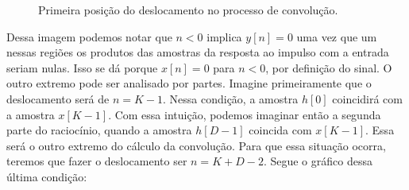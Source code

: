 \documentclass[a4paper,12pt]{article}
\begin{document}
\begin{figure}[H]
  \centering
  \caption{Primeira posição do deslocamento no processo de convolução.}
  \label{fig:begin_convolution}
\end{figure}

Dessa imagem podemos notar que $n<0$ implica $y[n]=0$ uma vez que um nessas regiões os produtos das amostras da resposta ao impulso com a entrada seriam nulas. Isso se dá porque $x[n]=0$ para $n<0$, por definição do sinal.
O outro extremo pode ser analisado por partes. Imagine primeiramente que o deslocamento será de $n=K-1$. Nessa condição, a amostra $h[0]$ coincidirá com a amostra $x[K-1]$. Com essa intuição, podemos imaginar então a segunda parte do raciocínio, quando a amostra $h[D-1]$ coincida com $x[K-1]$. Essa será o outro extremo do cálculo da convolução. Para que essa situação ocorra, teremos que fazer o deslocamento ser $n=K+D-2$. Segue o gráfico dessa última condição:
\end{document}
